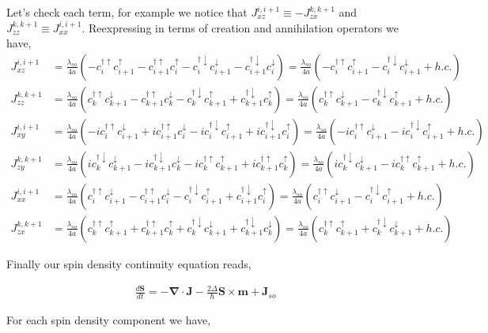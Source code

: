 \documentclass[10pt,prb,showpacs,amssymb,floatfix]{revtex4-1}
\newcommand{\dg}{\dagger}
\newcommand{\dna}{\downarrow}
\newcommand{\nn}{\nonumber}
\newcommand{\upa}{\uparrow}
\newcommand{\Dlt}{\Delta}
\begin{document}
Let's check each term, for example we notice that $J_{xz}^{i,i+1} \equiv -J_{zx}^{k,k+1}$ and $J_{zz}^{k,k+1}  \equiv J_{xx}^{i,i+1}$. Reexpressing  in terms of creation and annihilation operators we have, 
\begin{align}
J_{xz}^{i,i+1} &= \frac{\lambda_{so}}{4a} ( -c_i^{\dg\upa} c_{i+1}^\upa - c_{i+1}^{\dg\upa} c_{i}^\upa - c_{i}^{\dg\dna} c_{i+1}^\dna - c_{i+1}^{\dg\dna} c_{i}^\dna  )  =  \frac{\lambda_{so}}{4a} ( -c_i^{\dg\upa} c_{i+1}^\upa  - c_{i}^{\dg\dna} c_{i+1}^\dna + h.c. ) \nn\\
J_{zz}^{k,k+1} &= \frac{\lambda_{so}}{4a} ( c_k^{\dg\upa} c_{k+1}^\dna - c_{k+1}^{\dg\upa} c_{k}^\dna - c_{k}^{\dg\dna} c_{k+1}^\upa + c_{k+1}^{\dg\dna} c_{k}^\upa  ) =  \frac{\lambda_{so}}{4a} ( c_k^{\dg\upa} c_{k+1}^\dna - c_{k}^{\dg\dna} c_{k+1}^\upa + h.c. ) \nn\\
J_{xy}^{i,i+1} &= \frac{\lambda_{so}}{4a} ( -ic_i^{\dg\upa} c_{i+1}^\dna + ic_{i+1}^{\dg\upa} c_{i}^\dna - ic_{i}^{\dg\dna} c_{i+1}^\upa + ic_{i+1}^{\dg\dna} c_{i}^\upa  ) =  \frac{\lambda_{so}}{4a} ( -ic_i^{\dg\upa} c_{i+1}^\dna - ic_{i}^{\dg\dna} c_{i+1}^\upa + h.c.  ) \nn\\
J_{zy}^{k,k+1} &= \frac{\lambda_{so}}{4a} ( ic_k^{\dg\dna} c_{k+1}^\dna - ic_{k+1}^{\dg\dna} c_{k}^\dna - ic_{k}^{\dg\upa} c_{k+1}^\upa + ic_{k+1}^{\dg\upa} c_{k}^\upa  ) =  \frac{\lambda_{so}}{4a} ( ic_k^{\dg\dna} c_{k+1}^\dna  - ic_{k}^{\dg\upa} c_{k+1}^\upa + h.c.  ) \nn\\
J_{xx}^{i,i+1} &= \frac{\lambda_{so}}{4a} ( c_i^{\dg\upa} c_{i+1}^\dna - c_{i+1}^{\dg\upa} c_{i}^\dna - c_{i}^{\dg\dna} c_{i+1}^\upa + c_{i+1}^{\dg\dna} c_{i}^\upa  ) =  \frac{\lambda_{so}}{4a} ( c_i^{\dg\upa} c_{i+1}^\dna - c_{i}^{\dg\dna} c_{i+1}^\upa + h.c. ) \nn\\
J_{zx}^{k,k+1} &= \frac{\lambda_{so}}{4a} ( c_k^{\dg\upa} c_{k+1}^\upa + c_{k+1}^{\dg\upa} c_{k}^\upa + c_{k}^{\dg\dna} c_{k+1}^\dna + c_{k+1}^{\dg\dna} c_{k}^\dna  )  =  \frac{\lambda_{so}}{4a} ( c_k^{\dg\upa} c_{k+1}^\upa  + c_{k}^{\dg\dna} c_{k+1}^\dna + h.c. ) 
\end{align}


Finally our spin density continuity equation reads,

\begin{align}
\frac{d \bm S}{dt} = -\bm \nabla \cdot \bm J -\frac{2\Dlt}{\hbar} \bm S \times \bm m + \bm J_{so}
\end{align}

For each spin density component we have,
\end{document}
